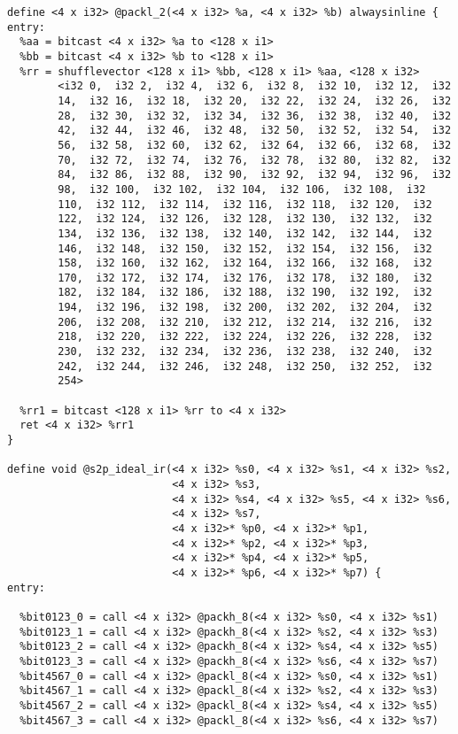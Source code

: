 \begin{lstlisting}
define <4 x i32> @packl_2(<4 x i32> %a, <4 x i32> %b) alwaysinline {
entry:
  %aa = bitcast <4 x i32> %a to <128 x i1>
  %bb = bitcast <4 x i32> %b to <128 x i1>
  %rr = shufflevector <128 x i1> %bb, <128 x i1> %aa, <128 x i32>
        <i32 0,  i32 2,  i32 4,  i32 6,  i32 8,  i32 10,  i32 12,  i32
        14,  i32 16,  i32 18,  i32 20,  i32 22,  i32 24,  i32 26,  i32
        28,  i32 30,  i32 32,  i32 34,  i32 36,  i32 38,  i32 40,  i32
        42,  i32 44,  i32 46,  i32 48,  i32 50,  i32 52,  i32 54,  i32
        56,  i32 58,  i32 60,  i32 62,  i32 64,  i32 66,  i32 68,  i32
        70,  i32 72,  i32 74,  i32 76,  i32 78,  i32 80,  i32 82,  i32
        84,  i32 86,  i32 88,  i32 90,  i32 92,  i32 94,  i32 96,  i32
        98,  i32 100,  i32 102,  i32 104,  i32 106,  i32 108,  i32
        110,  i32 112,  i32 114,  i32 116,  i32 118,  i32 120,  i32
        122,  i32 124,  i32 126,  i32 128,  i32 130,  i32 132,  i32
        134,  i32 136,  i32 138,  i32 140,  i32 142,  i32 144,  i32
        146,  i32 148,  i32 150,  i32 152,  i32 154,  i32 156,  i32
        158,  i32 160,  i32 162,  i32 164,  i32 166,  i32 168,  i32
        170,  i32 172,  i32 174,  i32 176,  i32 178,  i32 180,  i32
        182,  i32 184,  i32 186,  i32 188,  i32 190,  i32 192,  i32
        194,  i32 196,  i32 198,  i32 200,  i32 202,  i32 204,  i32
        206,  i32 208,  i32 210,  i32 212,  i32 214,  i32 216,  i32
        218,  i32 220,  i32 222,  i32 224,  i32 226,  i32 228,  i32
        230,  i32 232,  i32 234,  i32 236,  i32 238,  i32 240,  i32
        242,  i32 244,  i32 246,  i32 248,  i32 250,  i32 252,  i32
        254>

  %rr1 = bitcast <128 x i1> %rr to <4 x i32>
  ret <4 x i32> %rr1
}

define void @s2p_ideal_ir(<4 x i32> %s0, <4 x i32> %s1, <4 x i32> %s2,
                          <4 x i32> %s3,
                          <4 x i32> %s4, <4 x i32> %s5, <4 x i32> %s6,
                          <4 x i32> %s7,
                          <4 x i32>* %p0, <4 x i32>* %p1,
                          <4 x i32>* %p2, <4 x i32>* %p3,
                          <4 x i32>* %p4, <4 x i32>* %p5,
                          <4 x i32>* %p6, <4 x i32>* %p7) {
entry:

  %bit0123_0 = call <4 x i32> @packh_8(<4 x i32> %s0, <4 x i32> %s1)
  %bit0123_1 = call <4 x i32> @packh_8(<4 x i32> %s2, <4 x i32> %s3)
  %bit0123_2 = call <4 x i32> @packh_8(<4 x i32> %s4, <4 x i32> %s5)
  %bit0123_3 = call <4 x i32> @packh_8(<4 x i32> %s6, <4 x i32> %s7)
  %bit4567_0 = call <4 x i32> @packl_8(<4 x i32> %s0, <4 x i32> %s1)
  %bit4567_1 = call <4 x i32> @packl_8(<4 x i32> %s2, <4 x i32> %s3)
  %bit4567_2 = call <4 x i32> @packl_8(<4 x i32> %s4, <4 x i32> %s5)
  %bit4567_3 = call <4 x i32> @packl_8(<4 x i32> %s6, <4 x i32> %s7)


\end{lstlisting}
